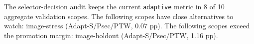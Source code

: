 The selector-decision audit keeps the current \texttt{adaptive} metric in 8 of 10 aggregate validation scopes.
The following scopes have close alternatives to watch: image-stress (Adapt-S/Psec/PTW, 0.07 pp).
The following scopes exceed the promotion margin: image-holdout (Adapt-S/Psec/PTW, 1.16 pp).
